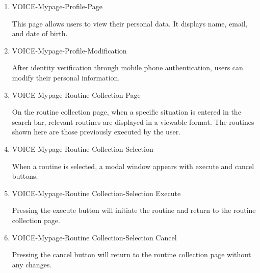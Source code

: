 \documentclass[conference]{IEEEtran}
\begin{document}
\begin{enumerate}[label=\arabic*]
    \begin{enumerate}[label=\arabic*)]   
        \item VOICE-Mypage-Profile-Page\par
        \vspace{0.3em}
        This page allows users to view their personal data. It displays name, email, and date of birth.

        \vspace{1em}

        \item VOICE-Mypage-Profile-Modification\par
        \vspace{0.3em}
        After identity verification through mobile phone authentication, users can modify their personal information.

        \vspace{1em}

        \item VOICE-Mypage-Routine Collection-Page\par
        \vspace{0.3em}
        On the routine collection page, when a specific situation is entered in the search bar, relevant routines are displayed in a viewable format. The routines shown here are those previously executed by the user.

        \vspace{1em}

        \item VOICE-Mypage-Routine Collection-Selection\par
        \vspace{0.3em}
        When a routine is selected, a modal window appears with execute and cancel buttons.

        \vspace{1em}

        \item VOICE-Mypage-Routine Collection-Selection Execute\par
        \vspace{0.3em}
        Pressing the execute button will initiate the routine and return to the routine collection page.

        \vspace{1em}

        \item VOICE-Mypage-Routine Collection-Selection Cancel\par
        \vspace{0.3em}
        Pressing the cancel button will return to the routine collection page without any changes.


\end{enumerate}
\end{enumerate}
\end{document}
